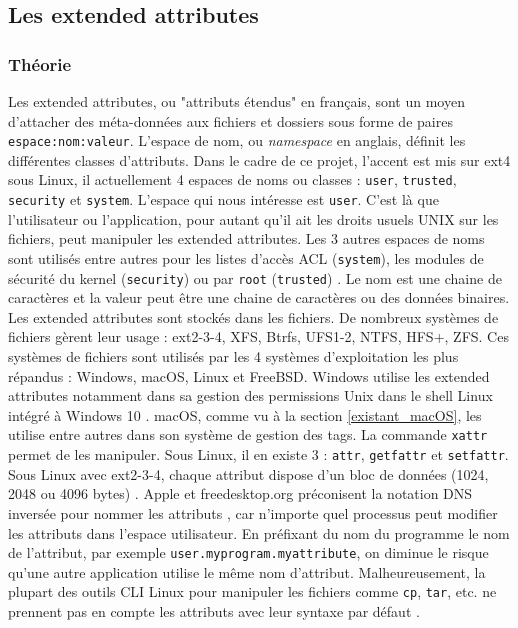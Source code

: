 \documentclass[a4paper, 12pt]{article}
\begin{document}
\subsection{Les extended attributes}\label{extended_attributes}
\subsubsection{Théorie}
Les extended attributes, ou "attributs étendus" en français, sont un moyen d'attacher des 
méta-données aux fichiers et dossiers sous forme de paires \texttt{espace:nom:valeur}. 
L'espace de nom, ou \textit{namespace} en anglais, définit les différentes classes d'attributs. 
Dans le cadre de ce projet, l'accent est mis sur ext4 sous Linux, il actuellement 4 espaces de noms 
ou classes : \texttt{user}, \texttt{trusted}, \texttt{security} et 
\texttt{system}. L'espace qui nous intéresse est \texttt{user}. C'est là que 
l'utilisateur ou l'application, pour autant qu'il ait les droits usuels UNIX sur les fichiers, peut 
manipuler les extended attributes. Les 3 autres espaces de noms sont utilisés entre autres pour 
les listes d'accès ACL (\texttt{system}), les modules de sécurité du kernel 
(\texttt{security}) ou par \texttt{root} (\texttt{trusted})
\cite{ref11} \cite{ref12}.
Le nom est une chaine de caractères et la valeur peut être une chaine de caractères ou des données binaires. 
Les extended attributes sont stockés dans les fichiers. De nombreux systèmes de fichiers gèrent leur 
usage : ext2-3-4, XFS, Btrfs, UFS1-2, NTFS, HFS+, ZFS. Ces systèmes de fichiers sont utilisés par 
les 4 systèmes d'exploitation les plus répandus : Windows, macOS, Linux et FreeBSD. Windows utilise 
les extended attributes notamment dans sa gestion des permissions Unix dans le shell Linux intégré 
à Windows 10 \cite{ref21}. macOS, comme vu à la section \ref{existant_macOS}, les utilise entre 
autres dans son système de gestion des tags. La commande \texttt{xattr} permet de les 
manipuler. Sous Linux, il en existe 3 : \texttt{attr}, \texttt{getfattr} et 
\texttt{setfattr}. Sous Linux avec ext2-3-4, chaque attribut dispose d'un bloc de données 
(1024, 2048 ou 4096 bytes) \cite{ref12}.
Apple et freedesktop.org préconisent la notation DNS inversée pour 
nommer les attributs \cite{ref8}, \cite{ref24} car n'importe quel processus peut modifier les 
attributs dans l'espace utilisateur. En préfixant du nom du programme le nom de l'attribut, par 
exemple \texttt{user.myprogram.myattribute}, on diminue le risque qu'une autre 
application utilise le même nom d'attribut. Malheureusement, la plupart des outils CLI Linux 
pour manipuler les fichiers comme \texttt{cp}, \texttt{tar}, etc. ne prennent 
pas en compte les attributs avec leur syntaxe par défaut \cite{ref4}.
\end{document}
